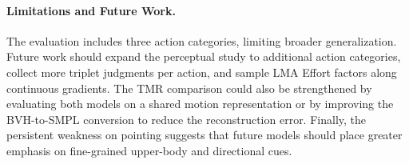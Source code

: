 \documentclass[letterpaper]{article} %
\begin{document}



\paragraph{Limitations and Future Work.} The evaluation includes three action categories, limiting broader generalization. Future work should expand the perceptual study to additional action categories, collect more triplet judgments per action, and sample LMA Effort factors along continuous gradients. The TMR comparison could also be strengthened by evaluating both models on a shared motion representation or by improving the BVH-to-SMPL conversion to reduce the reconstruction error. Finally, the persistent weakness on pointing suggests that future models should place greater emphasis on fine-grained upper-body and directional cues.
\end{document}
